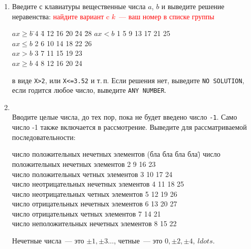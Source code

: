 \documentclass{article}
\begin{document}
\begin{enumerate}

\item
Введите с клавиатуры вещественные числа $a$, $b$ и выведите решение неравенства:
\hfill\textcolor{red}{найдите вариант c $k$~--- ваш номер в списке группы}
\newcommand{\grtb}{\>\color{red}}
\begin{tabbing}
$ax\geqslant b$ \hspace{18mm} \= \color{red}4 \=4 \=12 \=16 \=20 \=24 \=28\kill
$ax<b$  \> \color{red}1 \grtb 5 \grtb 9 \grtb  13 \grtb 17 \grtb 21 \grtb 25 
\\$ax\leqslant b$  \grtb  2 \grtb 6 \grtb 10 \grtb 14 \grtb 18 \grtb 22 \grtb 26
\\$ax>b$  \grtb  3 \grtb 7 \grtb 11 \grtb 15 \grtb 19 \grtb 23 
\\$ax\geqslant b$  \grtb  4 \grtb 8 \grtb 12 \grtb 16 \grtb 20 \grtb 24     
\end{tabbing}
в виде \texttt{X>2}, или  \texttt{X<=3.52} и т.\,п. Если решения нет, выведите \texttt{NO SOLUTION}, если годится любое число, выведите \texttt{ANY NUMBER}.

\item
{}\\
Вводите целые числа, до тех пор, пока не будет введено число \texttt{-1}. Само число -1 также включается в рассмотрение. Выведите для рассматриваемой последовательности:
\begin{tabbing}
число положительных нечетных элементов (бла бла бла бла)\=\kill
число положительных нечетных элементов      \>\color{red}2 9  16 23\\
число положительных четных элементов        \>\color{red}3 10 17 24\\
число неотрицательных нечетных элементов    \>\color{red}4 11 18 25\\
число неотрицательных четных элементов      \>\color{red}5 12 19 26\\
число отрицательных нечетных элементов      \>\color{red}6 13 20 27\\
число отрицательных четных элементов        \>\color{red}7 14 21\\
число неположительных нечетных элементов    \>\color{red}8 15 22
\end{tabbing}
Нечетные числа~--- это $\pm 1, \pm 3\ldots$, четные~---  это $0, \pm 2, \pm 4,\ ldots$.


\end{enumerate}
\end{document}
